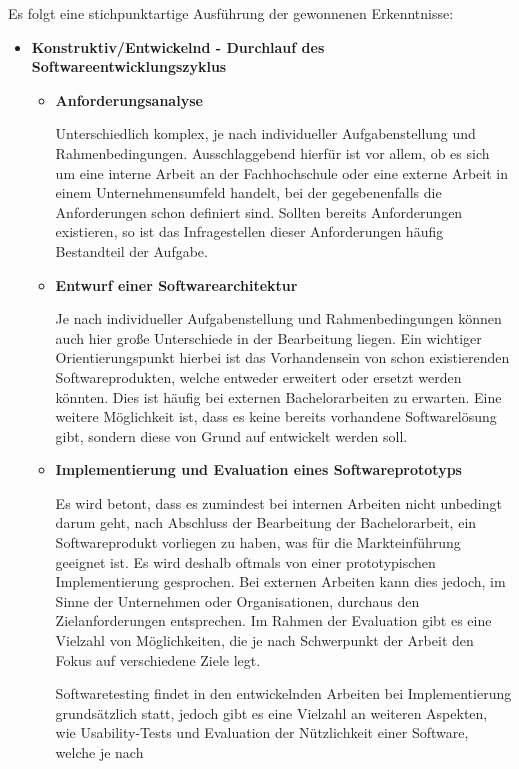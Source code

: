 \documentclass{scrreprt}
\begin{document}
\par\medskip Es folgt eine stichpunktartige Ausführung der gewonnenen Erkenntnisse:

\begin{itemize}
\item \textbf{Konstruktiv/Entwickelnd - Durchlauf des Softwareentwicklungszyklus}
	\begin{itemize}
	\item \textbf{Anforderungsanalyse}
	\par Unterschiedlich komplex, je nach individueller Aufgabenstellung und 
	Rahmenbedingungen. Ausschlaggebend hierfür ist vor allem, ob es sich um eine interne 
	Arbeit an der Fachhochschule oder eine externe Arbeit in einem 	
	Unternehmensumfeld handelt, bei der gegebenenfalls die Anforderungen schon definiert sind. 	
	Sollten bereits Anforderungen existieren, so ist das Infragestellen dieser Anforderungen 
	häufig Bestandteil der Aufgabe. 
	\item \textbf{Entwurf einer Softwarearchitektur}
	\par Je nach individueller Aufgabenstellung und Rahmenbedingungen können auch hier große 
	Unterschiede in der Bearbeitung liegen. Ein wichtiger Orientierungspunkt hierbei ist das 
	Vorhandensein von schon existierenden Softwareprodukten, welche entweder erweitert oder 
	ersetzt	werden könnten. Dies ist häufig bei externen Bachelorarbeiten zu erwarten. 
	Eine weitere Möglichkeit ist, dass es keine bereits vorhandene Softwarelösung gibt, 
	sondern diese von Grund auf entwickelt werden soll.
	\item \textbf{Implementierung und Evaluation eines Softwareprototyps}
	\par Es wird betont, dass es zumindest bei internen Arbeiten nicht unbedingt darum geht, 
	nach Abschluss der Bearbeitung der Bachelorarbeit, ein Softwareprodukt vorliegen zu haben, 
	was für die Markteinführung geeignet ist. Es wird deshalb oftmals von einer prototypischen 
	Implementierung gesprochen. Bei externen Arbeiten kann dies jedoch, im Sinne der Unternehmen 
	oder Organisationen, durchaus den Zielanforderungen entsprechen. Im Rahmen der Evaluation 
	gibt es eine Vielzahl von Möglichkeiten, die je nach Schwerpunkt der Arbeit den Fokus auf 
	verschiedene Ziele legt. 
	\par Softwaretesting findet in den entwickelnden Arbeiten bei 
	Implementierung grundsätzlich statt, jedoch gibt es eine Vielzahl an weiteren Aspekten, wie 
	Usability-Tests und Evaluation der Nützlichkeit einer Software, welche je nach 

\end{itemize}
\end{itemize}
\end{document}
